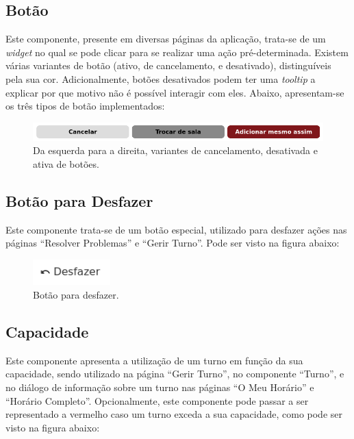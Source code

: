 \documentclass[12pt, a4paper]{article}
\begin{document}
\subsection{Botão}

Este componente, presente em diversas páginas da aplicação, trata-se de um \emph{widget} no qual se
pode clicar para se realizar uma ação pré-determinada. Existem várias variantes de botão (ativo, de
cancelamento, e desativado), distinguíveis pela sua cor. Adicionalmente, botões desativados podem
ter uma \emph{tooltip} a explicar por que motivo não é possível interagir com eles. Abaixo,
apresentam-se os três tipos de botão implementados:

\begin{figure}[H]
    \centering
    \includegraphics[width=\textwidth]{res/components/button.png}
    \caption{Da esquerda para a direita, variantes de cancelamento, desativada e ativa de botões.}
    \label{button}
\end{figure}

\subsection{Botão para Desfazer}

Este componente trata-se de um botão especial, utilizado para desfazer ações nas páginas
``Resolver Problemas'' e ``Gerir Turno''. Pode ser visto na figura abaixo:

\begin{figure}[H]
    \centering
    \includegraphics[width=3cm]{res/components/undo-button.png}
    \caption{Botão para desfazer.}
    \label{undo-button}
\end{figure}

\subsection{Capacidade}

Este componente apresenta a utilização de um turno em função da sua capacidade, sendo utilizado na
página ``Gerir Turno'', no componente ``Turno'', e no diálogo de informação sobre um turno nas
páginas ``O Meu Horário'' e ``Horário Completo''. Opcionalmente, este componente pode passar a ser
representado a vermelho caso um turno exceda a sua capacidade, como pode ser visto na figura abaixo:
\end{document}
